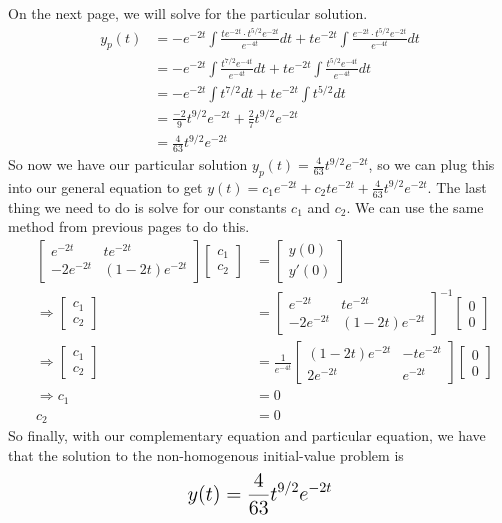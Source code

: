 \documentclass[11pt]{article}
\begin{document}
 On the next page, we will solve for the particular solution.
 \newpage
 \begin{align*}
   && y_p(t) &= -e^{-2t} \int \frac{te^{-2t} \cdot t^{5/2}e^{-2t}}{e^{-4t}}dt
   + te^{-2t} \int \frac{e^{-2t} \cdot t^{5/2}e^{-2t}}{e^{-4t}}dt && \\
   && &= -e^{-2t} \int \frac{t^{7/2}e^{-4t}}{e^{-4t}} dt 
   + te^{-2t} \int \frac{t^{5/2}e^{-4t}}{e^{-4t}} dt && \\
   && &= -e^{-2t} \int t^{7/2} dt + te^{-2t} \int t^{5/2} dt && \\
   && &= \frac{-2}{9}t^{9/2}e^{-2t} + \frac{2}{7}t^{9/2}e^{-2t} && \\
   && &= \frac{4}{63}t^{9/2}e^{-2t} &&
 \end{align*}
 So now we have our particular solution $y_p(t) = \frac{4}{63}t^{9/2}e^{-2t}$, so we can plug this into our 
 general equation to get $y(t) = c_1e^{-2t} + c_2te^{-2t} + \frac{4}{63}t^{9/2}e^{-2t}$.  The last thing we 
 need to do is solve for our constants $c_1$ and $c_2$.  We can use the same method from previous pages to 
 do this.
 \begin{align*}
&& \begin{bmatrix} e^{-2t} & te^{-2t} \\ -2e^{-2t} & (1-2t)e^{-2t} \end{bmatrix}
\begin{bmatrix} c_1 \\ c_2 \end{bmatrix} &= \begin{bmatrix} y(0) \\ y'(0) \end{bmatrix} && \\
&& \Rightarrow \begin{bmatrix} c_1 \\ c_2 \end{bmatrix} &= 
\begin{bmatrix} e^{-2t} & te^{-2t} \\ -2e^{-2t} & (1-2t)e^{-2t} \end{bmatrix} ^{-1}
\begin{bmatrix} 0 \\ 0 \end{bmatrix} && \\
&& \Rightarrow \begin{bmatrix} c_1 \\ c_2 \end{bmatrix} &= \frac{1}{e^{-4t}}
\begin{bmatrix} (1-2t)e^{-2t} & -te^{-2t} \\ 2e^{-2t} & e^{-2t} \end{bmatrix}
\begin{bmatrix} 0 \\ 0 \end{bmatrix} && \\
&& \Rightarrow c_1 &= 0 && \\ && c_2 &= 0 && 
 \end{align*}
 So finally, with our complementary equation and particular equation, we have that the solution to the 
 non-homogenous initial-value problem is
 $$\mathlarger{\mathlarger{y(t) = \frac{4}{63}t^{9/2}e^{-2t}}}$$
 \newpage
\end{document}
